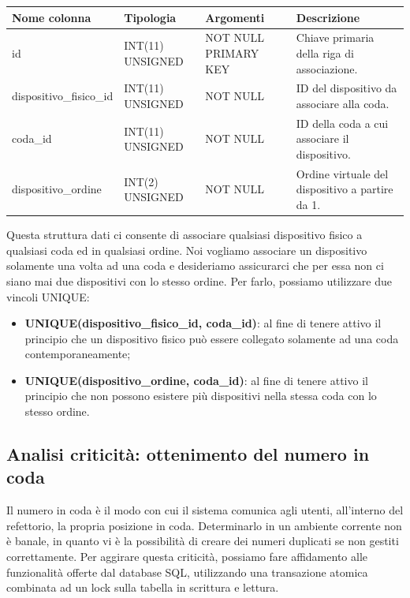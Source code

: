\documentclass[a4paper, titlepage, 12pt, openright, twoside]{book}
\begin{document}
\begin{center}
    \begin{tabular}{ | l | l | p{3cm} | p{3cm} |}
    \hline
    Nome colonna & Tipologia & Argomenti & Descrizione \\ \hline
    id & INT(11) UNSIGNED & NOT NULL PRIMARY KEY & Chiave primaria della riga di associazione. \\ \hline
    dispositivo\_fisico\_id & INT(11) UNSIGNED & NOT NULL & ID del dispositivo da associare alla coda. \\ \hline
    coda\_id & INT(11) UNSIGNED & NOT NULL & ID della coda a cui associare il dispositivo. \\ \hline
    dispositivo\_ordine & INT(2) UNSIGNED & NOT NULL & Ordine virtuale del dispositivo a partire da 1. \\ \hline
    \end{tabular}
\end{center}

Questa struttura dati ci consente di associare qualsiasi dispositivo fisico a qualsiasi coda ed in qualsiasi ordine. Noi vogliamo associare un dispositivo solamente una volta ad una coda e desideriamo assicurarci che per essa non ci siano mai due dispositivi con lo stesso ordine. Per farlo, possiamo utilizzare due vincoli UNIQUE:
\begin{itemize}
	\item \textbf{UNIQUE(dispositivo\_fisico\_id, coda\_id)}: al fine di tenere attivo il principio che un dispositivo fisico può essere collegato solamente ad una coda contemporaneamente;
	\item \textbf{UNIQUE(dispositivo\_ordine, coda\_id)}: al fine di tenere attivo il principio che non possono esistere più dispositivi nella stessa coda con lo stesso ordine.
\end{itemize}

\subsection{Analisi criticità: ottenimento del numero in coda}

Il numero in coda è il modo con cui il sistema comunica agli utenti, all'interno del refettorio, la propria posizione in coda. Determinarlo in un ambiente corrente non è banale, in quanto vi è la possibilità di creare dei numeri duplicati se non gestiti correttamente. Per aggirare questa criticità, possiamo fare affidamento alle funzionalità offerte dal database SQL, utilizzando una transazione atomica combinata ad un lock sulla tabella in scrittura e lettura.
\end{document}
